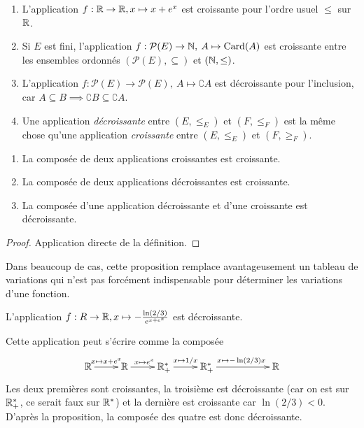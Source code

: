 \begin{exemple}
\begin{enumerate}
\item L'application $f : \mathbb{R}\to \mathbb{R}, x\mapsto x+e^x$ est croissante pour l'ordre usuel $\leq $ sur $\mathbb{R}$.
\item Si $E$ est fini, l'application $f : \mathcal P(E) \to \mathbb{N}, \: A\mapsto \operatorname{Card}(A)$ est croissante entre les ensembles ordonnés $(\mathcal P(E), \subseteq)$ et $(\mathbb{N}, \leq)$.
\item L'application $f : \mathcal P(E) \to \mathcal P(E), \: A\mapsto \complement A$ est décroissante pour l'inclusion, car $A\subseteq B \implies \complement B\subseteq \complement A$.
\item Une application \emph{décroissante} entre $(E,\leq_E)$ et $(F,\leq_F)$ est la même chose qu'une application \emph{croissante} entre $(E,\leq_E)$ et $(F,\geq_F)$.
\end{enumerate}
\end{exemple}




\begin{proposition}
\begin{enumerate}
\item La composée de deux applications croissantes est croissante.
\item La composée de deux applications décroissantes est croissante.
\item La composée d'une application décroissante et d'une croissante est décroissante.
\end{enumerate}
\end{proposition}

\begin{proof}
Application directe de la définition.
\end{proof}

Dans beaucoup de cas, cette proposition remplace avantageusement un \og tableau de variations\fg{} qui n'est pas forcément indispensable pour déterminer les variations d'une fonction.

\begin{exemple}
L'application $f : R\to \mathbb{R}, x\mapsto -\frac{\ln(2/3)}{e^{x+e^x}}$ est décroissante.
\end{exemple}
\begin{red}
Cette application peut s'écrire comme la composée
\[\xymatrix{
\R \ar[r]^{x\mapsto x+e^x}
& \R \ar[r]^{x\mapsto e^x}
& \R_+^* \ar[r]^{x\mapsto 1/x}
& \R_+^* \ar[rr]^{x\mapsto -\ln(2/3)x}
& & \R
} \]
Les deux premières sont croissantes, la troisième est décroissante (car on est sur $\mathbb{R}_+^*$, ce serait faux sur $\mathbb{R}^*$) et la dernière est croissante car $\ln(2/3)<0$. D'après la proposition, la composée des quatre est donc décroissante.
\end{red}



